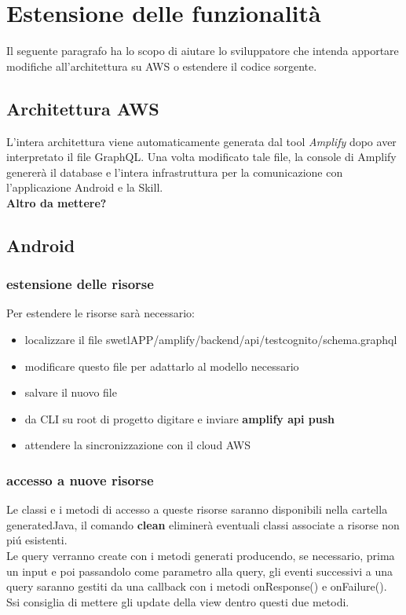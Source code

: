 \clearpage

\section{Estensione delle funzionalità}

Il seguente paragrafo ha lo scopo di aiutare lo sviluppatore che intenda apportare modifiche all'architettura su AWS o estendere il codice sorgente.

\subsection{Architettura AWS}

L'intera architettura viene automaticamente generata dal tool \emph{Amplify} dopo aver interpretato il file GraphQL. Una volta modificato tale file, la console di Amplify genererà il database e l'intera infrastruttura per la comunicazione con l'applicazione Android e la Skill.\\[0.25cm]

\textbf{Altro da mettere?}

\subsection{Android}

\subsubsection{estensione delle risorse}
Per estendere le risorse sarà necessario:
\begin{itemize}
\item localizzare il file swetlAPP/amplify/backend/api/testcognito/schema.graphql
\item modificare questo file per adattarlo al modello necessario
\item salvare il nuovo file
\item da CLI su root di progetto digitare e inviare \textbf{amplify api push}
\item attendere la sincronizzazione con il cloud AWS
\end{itemize}

\subsubsection{accesso a nuove risorse}
Le classi e i metodi di accesso a queste risorse saranno disponibili nella cartella generatedJava, il comando \textbf{clean} eliminerà eventuali  classi associate a risorse non piú esistenti. \\
Le query verranno create con i metodi generati producendo, se necessario, prima un input e poi passandolo come parametro alla query, gli eventi successivi a una query saranno gestiti da una callback con i metodi onResponse() e onFailure(). \\
Ssi consiglia di mettere gli update della view dentro questi due metodi.

